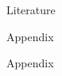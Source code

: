 \documentclass[aspectratio=169,11pt]{beamer}
\begin{document}
\begin{frame}[shrink=15]{Literature}




\end{frame}











\appendix



\pagestyle{empty}


\begin{frame}{Appendix}
	
	\begin{center}
	\huge Appendix
	\end{center}
	
\end{frame}
\end{document}
